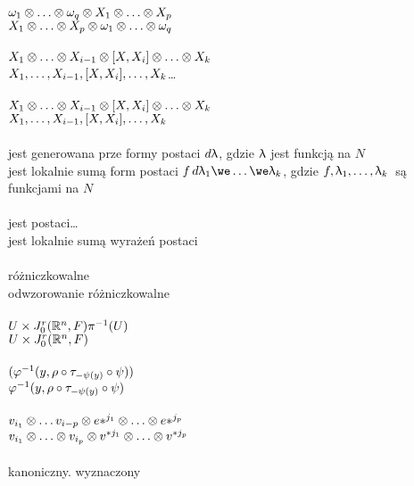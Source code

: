 \documentclass[a4paper,11pt]{article}
\begin{document}
 \\
\Jest $\omega_{ 1 } \otimes \ldots \otimes \omega_{ q } \otimes X_{ 1 } \otimes \ldots
\otimes X_{ p }$ \\
\Pow $X_{ 1 } \otimes \ldots \otimes X_{ p } \otimes \omega_{ 1 } \otimes \ldots \otimes
\omega_{ q }$ \\
 \\
\Jest $X_{ 1 } \otimes \ldots \otimes X_{ i - 1 } \otimes [ X, X_{ i } ] \otimes \ldots
\otimes X_{ k }$\ld \\
\Pow $X_{ 1 }, \ldots, X_{ i - 1 }, [ X, X_{ i } ], \ldots, X_{ k }$\ldots \\
 \\
\Jest $X_{ 1 } \otimes \ldots \otimes X_{ i - 1 } \otimes [ X, X_{ i } ] \otimes \ldots
\otimes X_{ k }$\ld \\
\Pow $X_{ 1 }, \ldots, X_{ i - 1 }, [ X, X_{ i } ], \ldots, X_{ k }$\ld \\
 \\
\Jest jest generowana prze formy postaci $d \uplambda$, gdzie $\uplambda$
jest funkcją na $N$\ld \\
\Pow jest lokalnie sumą form postaci
$f\, d\la_{ 1 } \we \ldots \we \la_{ k }$, gdzie
$f, \uplambda_{ 1 }, \ldots, \uplambda_{ k }$~są funkcjami na $N$\ld \\
 \\
\Jest jest postaci\ldots \\
\Pow  jest lokalnie sumą wyrażeń postaci\ld \\
 \\
\Jest różniczkowalne \\
\Pow  odwzorowanie różniczkowalne \\
 \\
\Jest $U \times J^{ r }_{ 0 }( \mathbb{R}^{ n }, F ) \pi^{ -1 }( U )$ \\
\Pow  $U \times J^{ r }_{ 0 }( \mathbb{R}^{ n }, F )$ \\
 \\
\Jest $( \varphi^{ -1 }( y, \rho \circ \tau_{ -\psi( y ) } \circ \psi ) )$ \\
\Pow  $\varphi^{ -1 }( y, \rho \circ \tau_{ -\psi( y ) } \circ \psi )$ \\
 \\
\Jest $v_{ i_{ 1 } } \otimes \ldots v_{ i - p } \otimes { e* }^{ j_{ 1 } } \otimes
\ldots \otimes { e* }^{ j_{ p } }$ \\
\Pow $v_{ i_{ 1 } } \otimes \ldots \otimes v_{ i_{ p } } \otimes v^{ * j_{ 1 } } \otimes
\ldots \otimes v^{ * j_{ p } }$ \\
 \\
\Jest kanoniczny. wyznaczony \\
\end{document}
